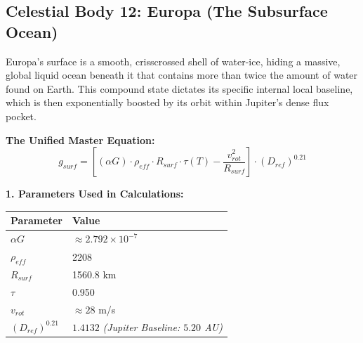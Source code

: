 \documentclass[11pt, a4paper]{article}
\begin{document}
\clearpage
\subsection{Celestial Body 12: Europa (The Subsurface Ocean)}
  Europa’s surface is a smooth, crisscrossed shell of water-ice, hiding a massive, global liquid ocean beneath it that contains more than twice the amount of water found on Earth. This compound state dictates its specific internal local baseline, which is then exponentially boosted by its orbit within Jupiter's dense flux pocket.

  \vspace{0.5em}
  \noindent \textbf{The Unified Master Equation:}
  $$ g_{surf} = \left[ (\alpha G) \cdot \rho_{eff} \cdot R_{surf} \cdot \tau(T) - \frac{v_{rot}^2}{R_{surf}} \right] \cdot (D_{ref})^{0.21} $$

  \vspace{0.5em}
  \noindent \textbf{1. Parameters Used in Calculations:} \\[0.5em]
  \begingroup
  \renewcommand{\arraystretch}{1.3}
  \hspace*{2em}
  \begin{tabular}{|l|l|}
    \hline
    \textbf{Parameter} & \textbf{Value} \\ \hline
    $\alpha G$ & $\approx 2.792 \times 10^{-7}$ \\ \hline
    $\rho_{eff}$ & 2208 \\ \hline
    $R_{surf}$ & 1560.8 km \\ \hline
    $\tau$ & 0.950 \\ \hline
    $v_{rot}$ & $\approx 28$ m/s \\ \hline
    $(D_{ref})^{0.21}$ & $1.4132$ \textit{(Jupiter Baseline: $5.20$ AU)} \\ \hline
  \end{tabular}
  \endgroup
\end{document}
